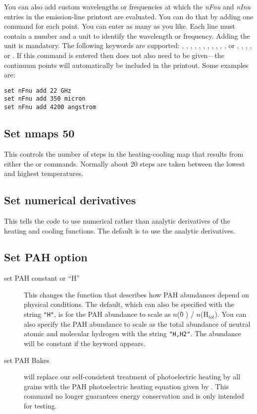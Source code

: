 You can also add custom wavelengths or frequencies at which the \emph{nFnu}
and \emph{nInu} entries in the emission-line printout are evaluated. You can
do that by adding one  command for each point. You can
enter as many as you like. Each line must contain a number and a unit to identify
the wavelength or frequency. Adding the unit is mandatory. The following keywords
are supported: , , ,
, , , ,
, , , ,
 or , 
, , ,  or
.
If this command is entered then 
does not also need to
be given---the continuum points will automatically be included in the printout.
Some examples are:
\begin{verbatim}
set nFnu add 22 GHz
set nFnu add 350 micron
set nFnu add 4200 angstrom
\end{verbatim}

\subsection{Set nmaps 50}

This controls the number of steps in the heating-cooling map that results
from either the  or  commands.  Normally about 20 steps are
taken between the lowest and highest temperatures.

\subsection{Set numerical derivatives}

This tells the code to use numerical rather than analytic derivatives
of the heating and cooling functions.
The default is to use the analytic derivatives.

\subsection{Set PAH option}
\begin{description}
\item[set PAH constant or ``H'']
This changes the function that describes how
PAH abundances depend on physical conditions.  The default, which can also
be specified with the string \verb|"H"|, is for the PAH abundance to
scale as $n$(\h0 ) / $n$(H$_{tot}$).  You can also specify the PAH abundance
to scale as the total abundance of neutral atomic and molecular hydrogen
with the string \verb|"H,H2"|.
The abundance will be constant if the keyword
 appears.

\item[set PAH Bakes] will replace our self-consistent
treatment of photoelectric heating by all grains
with the PAH photoelectric heating equation given by \citet{Bakes1994}.
This command no longer guarantees energy conservation and is only intended for testing.
\end{description}

